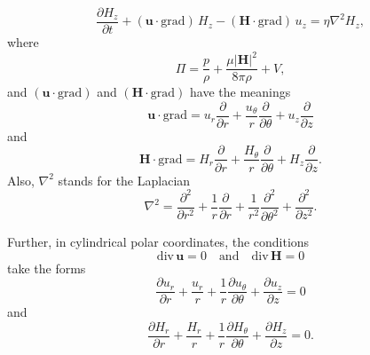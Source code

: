\begin{equation}
\frac{\partial H_z}{\partial t} + (\mathbf{u} \cdot \mathrm{grad})\, H_z - (\mathbf{H} \cdot \mathrm{grad})\, u_z = \eta \nabla^2 H_z, \label{eq:9-6}
\end{equation}
where
\begin{equation}
\Pi = \frac{p}{\rho} + \frac{\mu |\mathbf{H}|^2}{8\pi\rho} + V, \label{eq:9-7}
\end{equation}
and $(\mathbf{u} \cdot \mathrm{grad})$ and $(\mathbf{H} \cdot \mathrm{grad})$ have the meanings
\begin{equation}
\mathbf{u} \cdot \mathrm{grad} = u_r \frac{\partial}{\partial r} + \frac{u_\theta}{r}\frac{\partial}{\partial \theta} + u_z \frac{\partial}{\partial z} \label{eq:9-8}
\end{equation}
and
\begin{equation}
\mathbf{H} \cdot \mathrm{grad} = H_r \frac{\partial}{\partial r} + \frac{H_\theta}{r}\frac{\partial}{\partial \theta} + H_z \frac{\partial}{\partial z}. \label{eq:9-9}
\end{equation}
Also, $\nabla^2$ stands for the Laplacian
\begin{equation}
\nabla^2 = \frac{\partial^2}{\partial r^2} + \frac{1}{r}\frac{\partial}{\partial r} + \frac{1}{r^2}\frac{\partial^2}{\partial \theta^2} + \frac{\partial^2}{\partial z^2}. \label{eq:9-10}
\end{equation}

Further, in cylindrical polar coordinates, the conditions
\begin{equation}
\mathrm{div}\,\mathbf{u} = 0 \quad \text{and} \quad \mathrm{div}\,\mathbf{H} = 0 \label{eq:9-11}
\end{equation}
take the forms
\begin{equation}
\frac{\partial u_r}{\partial r} + \frac{u_r}{r} + \frac{1}{r}\frac{\partial u_\theta}{\partial \theta} + \frac{\partial u_z}{\partial z} = 0 \label{eq:9-12}
\end{equation}
and
\begin{equation}
\frac{\partial H_r}{\partial r} + \frac{H_r}{r} + \frac{1}{r}\frac{\partial H_\theta}{\partial \theta} + \frac{\partial H_z}{\partial z} = 0. \label{eq:9-13}
\end{equation}

